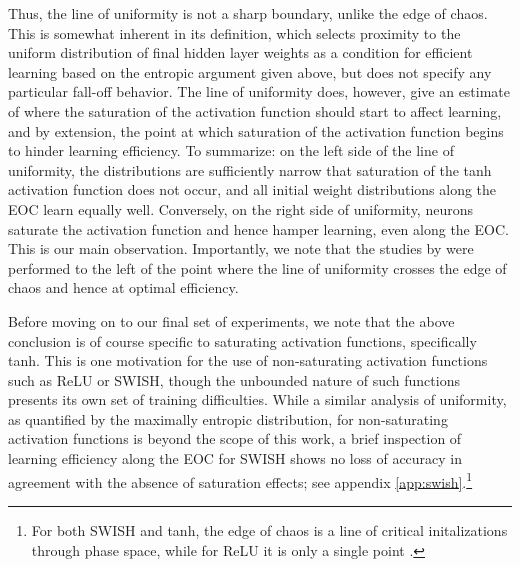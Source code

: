 Thus, the line of uniformity is not a sharp boundary, unlike the edge of chaos. This is somewhat inherent in its definition, which selects proximity to the uniform distribution of final hidden layer weights as a condition for efficient learning based on the entropic argument given above, but does not specify any particular fall-off behavior. The line of uniformity does, however, give an estimate of where the saturation of the activation function should start to affect learning, and by extension, the point at which saturation of the activation function begins to hinder learning efficiency. To summarize: on the left side of the line of uniformity, the distributions are sufficiently narrow that saturation of the tanh activation function does not occur, and all initial weight distributions along the EOC learn equally well. Conversely, on the right side of uniformity, neurons saturate the activation function and hence hamper learning, even along the EOC. This is our main observation. Importantly, we note that the studies by \cite{2016arXiv161101232S} were performed to the left of the point where the line of uniformity crosses the edge of chaos and hence at optimal efficiency. 

Before moving on to our final set of experiments, we note that the above conclusion is of course specific to saturating activation functions, specifically tanh. This is one motivation for the use of non-saturating activation functions such as ReLU or SWISH, though the unbounded nature of such functions presents its own set of training difficulties. While a similar analysis of uniformity, as quantified by the maximally entropic distribution, for non-saturating activation functions is beyond the scope of this work, a brief inspection of learning efficiency along the EOC for SWISH shows no loss of accuracy in agreement with the absence of saturation effects; see appendix \ref{app:swish}.\footnote{For both SWISH and tanh, the edge of chaos is a line of critical initalizations through phase space, while for ReLU it is only a single point \cite{Roberts:2021fes}.}

